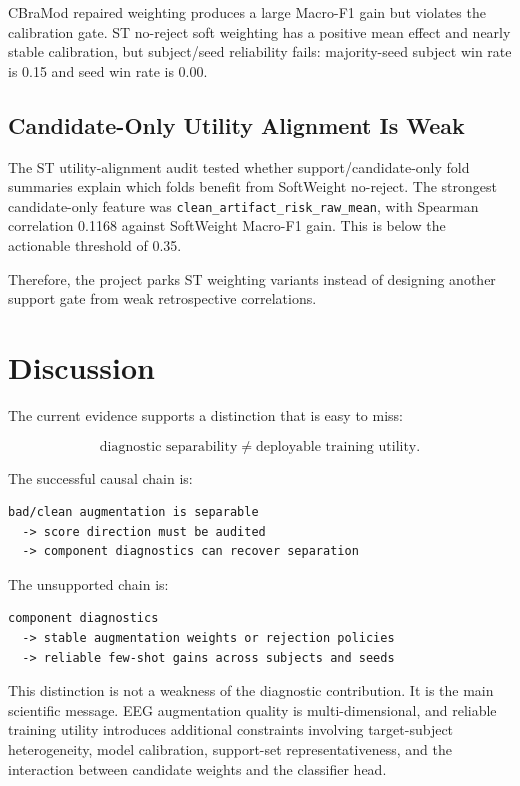 \documentclass[11pt]{article}
\begin{document}
CBraMod repaired weighting produces a large Macro-F1 gain but violates the calibration gate. ST no-reject soft weighting has a positive mean effect and nearly stable calibration, but subject/seed reliability fails: majority-seed subject win rate is 0.15 and seed win rate is 0.00.

\subsection{Candidate-Only Utility Alignment Is Weak}

The ST utility-alignment audit tested whether support/candidate-only fold summaries explain which folds benefit from SoftWeight no-reject. The strongest candidate-only feature was \texttt{clean\_\allowbreak artifact\_\allowbreak risk\_\allowbreak raw\_\allowbreak mean}, with Spearman correlation 0.1168 against SoftWeight Macro-F1 gain. This is below the actionable threshold of 0.35.

Therefore, the project parks ST weighting variants instead of designing another support gate from weak retrospective correlations.

\section{Discussion}

The current evidence supports a distinction that is easy to miss:

\[
\text{diagnostic separability} \ne \text{deployable training utility}.
\]

The successful causal chain is:

\begin{verbatim}
bad/clean augmentation is separable
  -> score direction must be audited
  -> component diagnostics can recover separation
\end{verbatim}

The unsupported chain is:

\begin{verbatim}
component diagnostics
  -> stable augmentation weights or rejection policies
  -> reliable few-shot gains across subjects and seeds
\end{verbatim}

This distinction is not a weakness of the diagnostic contribution. It is the main scientific message. EEG augmentation quality is multi-dimensional, and reliable training utility introduces additional constraints involving target-subject heterogeneity, model calibration, support-set representativeness, and the interaction between candidate weights and the classifier head.
\end{document}
